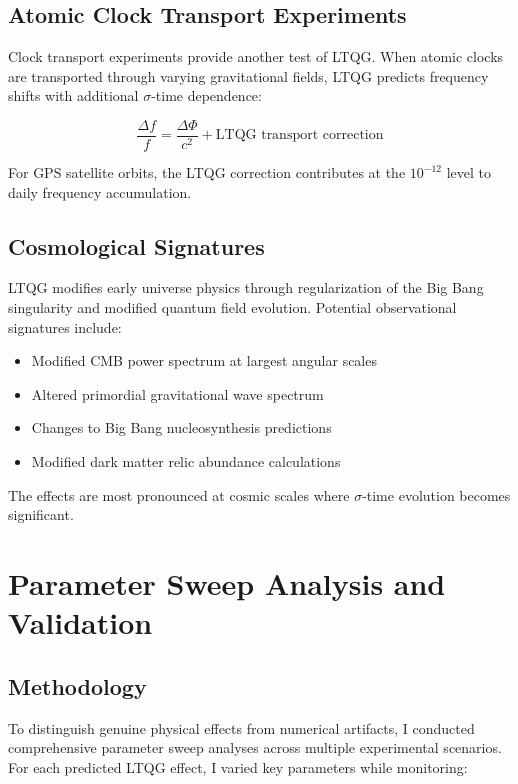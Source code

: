 \documentclass[12pt,a4paper]{article}
\begin{document}
\subsection{Atomic Clock Transport Experiments}

Clock transport experiments provide another test of LTQG. When atomic clocks are transported through varying gravitational fields, LTQG predicts frequency shifts with additional $\sigma$-time dependence:

\begin{equation}
\frac{\Delta f}{f} = \frac{\Delta \Phi}{c^2} + \text{LTQG transport correction}
\end{equation}

For GPS satellite orbits, the LTQG correction contributes at the $10^{-12}$ level to daily frequency accumulation.

\subsection{Cosmological Signatures}

LTQG modifies early universe physics through regularization of the Big Bang singularity and modified quantum field evolution. Potential observational signatures include:

\begin{itemize}
\item Modified CMB power spectrum at largest angular scales
\item Altered primordial gravitational wave spectrum
\item Changes to Big Bang nucleosynthesis predictions
\item Modified dark matter relic abundance calculations
\end{itemize}

The effects are most pronounced at cosmic scales where $\sigma$-time evolution becomes significant.

\section{Parameter Sweep Analysis and Validation}

\subsection{Methodology}

To distinguish genuine physical effects from numerical artifacts, I conducted comprehensive parameter sweep analyses across multiple experimental scenarios. For each predicted LTQG effect, I varied key parameters while monitoring:
\end{document}
